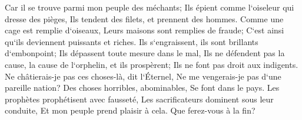 \verse Car il se trouve parmi mon peuple des méchants; Ils épient comme l`oiseleur qui dresse des pièges, Ils tendent des filets, et prennent des hommes. 
\verse Comme une cage est remplie d`oiseaux, Leurs maisons sont remplies de fraude; C`est ainsi qu`ils deviennent puissants et riches. 
\verse Ils s`engraissent, ils sont brillants d`embonpoint; Ils dépassent toute mesure dans le mal, Ils ne défendent pas la cause, la cause de l`orphelin, et ils prospèrent; Ils ne font pas droit aux indigents. 
\verse Ne châtierais-je pas ces choses-là, dit l`Éternel, Ne me vengerais-je pas d`une pareille nation? 
\verse Des choses horribles, abominables, Se font dans le pays. 
\verse Les prophètes prophétisent avec fausseté, Les sacrificateurs dominent sous leur conduite, Et mon peuple prend plaisir à cela. Que ferez-vous à la fin? 

